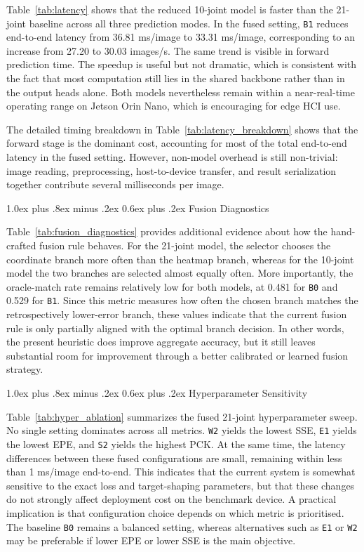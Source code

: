 \documentclass[10pt,letterpaper,twocolumn]{article}
\makeatletter
\renewcommand\subsection{\@startsection{subsection}{2}{\z@}%
  {1.0ex plus .8ex minus .2ex}%
  {0.6ex plus .2ex}%
  {\normalfont\itshape}}
\makeatother
\begin{document}
Table~\ref{tab:latency} shows that the reduced 10-joint model is faster than the 21-joint baseline across all three prediction modes. In the fused setting, \texttt{B1} reduces end-to-end latency from 36.81 ms/image to 33.31 ms/image, corresponding to an increase from 27.20 to 30.03 images/s. The same trend is visible in forward prediction time. The speedup is useful but not dramatic, which is consistent with the fact that most computation still lies in the shared backbone rather than in the output heads alone. Both models nevertheless remain within a near-real-time operating range on Jetson Orin Nano, which is encouraging for edge HCI use.

The detailed timing breakdown in Table~\ref{tab:latency_breakdown} shows that the forward stage is the dominant cost, accounting for most of the total end-to-end latency in the fused setting. However, non-model overhead is still non-trivial: image reading, preprocessing, host-to-device transfer, and result serialization together contribute several milliseconds per image. 

\subsection{Fusion Diagnostics}

Table~\ref{tab:fusion_diagnostics} provides additional evidence about how the hand-crafted fusion rule behaves. For the 21-joint model, the selector chooses the coordinate branch more often than the heatmap branch, whereas for the 10-joint model the two branches are selected almost equally often. More importantly, the oracle-match rate remains relatively low for both models, at 0.481 for \texttt{B0} and 0.529 for \texttt{B1}. Since this metric measures how often the chosen branch matches the retrospectively lower-error branch, these values indicate that the current fusion rule is only partially aligned with the optimal branch decision. In other words, the present heuristic does improve aggregate accuracy, but it still leaves substantial room for improvement through a better calibrated or learned fusion strategy.

\subsection{Hyperparameter Sensitivity}

Table~\ref{tab:hyper_ablation} summarizes the fused 21-joint hyperparameter sweep. No single setting dominates across all metrics. \texttt{W2} yields the lowest SSE, \texttt{E1} yields the lowest EPE, and \texttt{S2} yields the highest PCK. At the same time, the latency differences between these fused configurations are small, remaining within less than 1 ms/image end-to-end. This indicates that the current system is somewhat sensitive to the exact loss and target-shaping parameters, but that these changes do not strongly affect deployment cost on the benchmark device. A practical implication is that configuration choice depends on which metric is prioritised. The baseline \texttt{B0} remains a balanced setting, whereas alternatives such as \texttt{E1} or \texttt{W2} may be preferable if lower EPE or lower SSE is the main objective.
\end{document}
